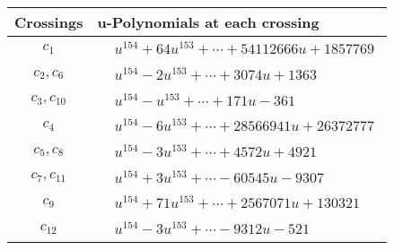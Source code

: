 \documentclass[1p]{elsarticle_modified}
\theoremstyle{definition}
\begin{document}
\begin{tabular}{m{50pt}|m{274pt}}
Crossings & \hspace{64pt}u-Polynomials at each crossing \\
\hline $$\begin{aligned}c_{1}\end{aligned}$$&$\begin{aligned}
&u^{154}+64 u^{153}+\cdots+54112666 u+1857769
\end{aligned}$\\
\hline $$\begin{aligned}c_{2},c_{6}\end{aligned}$$&$\begin{aligned}
&u^{154}-2 u^{153}+\cdots+3074 u+1363
\end{aligned}$\\
\hline $$\begin{aligned}c_{3},c_{10}\end{aligned}$$&$\begin{aligned}
&u^{154}- u^{153}+\cdots+171 u-361
\end{aligned}$\\
\hline $$\begin{aligned}c_{4}\end{aligned}$$&$\begin{aligned}
&u^{154}-6 u^{153}+\cdots+28566941 u+26372777
\end{aligned}$\\
\hline $$\begin{aligned}c_{5},c_{8}\end{aligned}$$&$\begin{aligned}
&u^{154}-3 u^{153}+\cdots+4572 u+4921
\end{aligned}$\\
\hline $$\begin{aligned}c_{7},c_{11}\end{aligned}$$&$\begin{aligned}
&u^{154}+3 u^{153}+\cdots-60545 u-9307
\end{aligned}$\\
\hline $$\begin{aligned}c_{9}\end{aligned}$$&$\begin{aligned}
&u^{154}+71 u^{153}+\cdots+2567071 u+130321
\end{aligned}$\\
\hline $$\begin{aligned}c_{12}\end{aligned}$$&$\begin{aligned}
&u^{154}-3 u^{153}+\cdots-9312 u-521
\end{aligned}$\\
\hline
\end{tabular}\\~\\
\end{document}
